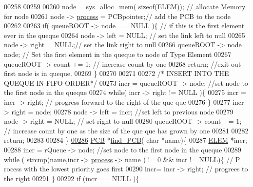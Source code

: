 \begin{DoxyCode}
{{00258         
00259         
00260         node = sys\_alloc\_mem( \textcolor{keyword}{sizeof}(\hyperlink{structpage}{ELEM})); \textcolor{comment}{// allocate Memory for node}
00261         node -> \hyperlink{structprocess}{process} = PCBpointer;\textcolor{comment}{// add the PCB to the node}
00262         
00263         \textcolor{keywordflow}{if}( queueROOT -> node == NULL )\{ \textcolor{comment}{// if this is the first element ever in 
      the queque}
00264                 node -> left = NULL; \textcolor{comment}{// set the link left to null}
00265                 node -> right = NULL;\textcolor{comment}{// set the link right to null}
00266                 queueROOT -> node = node; \textcolor{comment}{// Set the first element in the queque 
      to node of Type Element}
00267                 queueROOT -> count += 1; \textcolor{comment}{// increase count by one}
00268                 \textcolor{keywordflow}{return}; \textcolor{comment}{//exit out first node is in queque. }
00269         \}
00270         
00271         
00272         \textcolor{comment}{/* INSERT INTO THE QUEQUE IN FIFO ORDER*/}
00273         incr = queueROOT -> node; \textcolor{comment}{//set node to the first node in the queque}
00274         \textcolor{keywordflow}{while}( incr -> right != NULL )\{
00275                 incr = incr -> right; \textcolor{comment}{// progress forward to the right of the que
      que}
00276         \}
00277          incr -> right = node;
00278          node -> left = incr; \textcolor{comment}{//set left to previous node}
00279          node -> right = NULL; \textcolor{comment}{// set right to null }
00280          queueROOT -> count += 1; \textcolor{comment}{// increase count by one as the size of the que
      que has grown by one}
00281          
00282          \textcolor{keywordflow}{return};
00283 
00284 \}
\hypertarget{mpx__r2_8c_source_l00286}{}\hyperlink{mpx__r2_8h_a612a6abcb66c688a32f33abc93ff3990}{00286} \hyperlink{structprocess}{PCB} *\hyperlink{mpx__r2_8c_a612a6abcb66c688a32f33abc93ff3990}{find_PCB}( \textcolor{keywordtype}{char} *name)\{
00287         \hyperlink{structpage}{ELEM} *incr;
00288         incr =  rQueue -> node; \textcolor{comment}{//set node to the first node in the queque}
00289         \textcolor{keywordflow}{while} ( strcmp(name,incr -> \hyperlink{structprocess}{process} -> name ) != 0 && incr != NULL)\{ \textcolor{comment}{// P
      rocess with the lowest priority goes first }
00290                         incr= incr -> right; \textcolor{comment}{// progrees to the right }
00291         \}
00292         \textcolor{keywordflow}{if} (incr == NULL )\{
}}
\end{DoxyCode}
